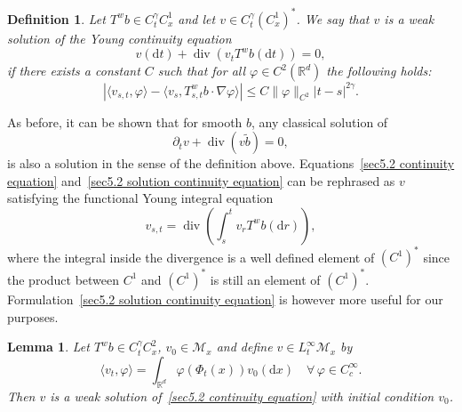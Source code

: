 \documentclass[10pt]{article}
\newcommand{\mathd}{\mathrm{d}}
\newcommand{\tmop}[1]{\ensuremath{\operatorname{#1}}}
\newtheorem{definition}{Definition}
\newtheorem{lemma}{Lemma}
\begin{document}
\begin{definition}
  \label{sec5.2 defn weak continuity eq}Let $T^w b \in C^{\gamma}_t C_x^1$ and
  let $v \in C^{\gamma}_t (C^1_x)^{\ast}$. We say that $v$ is a weak solution
  of the Young continuity equation
  \begin{equation}
    v (\mathd t) + \tmop{div} (v_t T^w b (\mathd t)) = 0, \label{sec5.2
    continuity equation}
  \end{equation}
  if there exists a constant $C$ such that for all $\varphi \in C^2
  (\mathbb{R}^d)$ the following holds:
  \begin{equation}
    | \langle v_{s, t}, \varphi \rangle - \langle v_s, T^w_{s, t} b \cdot
    \nabla \varphi \rangle | \leqslant C \| \varphi \|_{C^2} | t - s |^{2
    \gamma} . \label{sec5.2 solution continuity equation}
  \end{equation}
\end{definition}

\begin{remark}
  As before, it can be shown that for smooth $b$, any classical solution of
  \[ \partial_t v + \tmop{div} (v \tilde{b}) = 0, \]
  is also a solution in the sense of the definition above.
  Equations~{\eqref{sec5.2 continuity equation}} and~{\eqref{sec5.2 solution
  continuity equation}} can be rephrased as $v$ satisfying the functional
  Young integral equation
  \[ v_{s, t} = \tmop{div} \left( \int_s^t v_r T^w b (\mathd r) \right), \]
  where the integral inside the divergence is a well defined element of
  $(C^1)^{\ast}$ since the product between $C^1$ and $(C^1)^{\ast}$ is still
  an element of $(C^1)^{\ast}$. Formulation~{\eqref{sec5.2 solution continuity
  equation}} is however more useful for our purposes.
\end{remark}

\begin{lemma}
  \label{sec5.2 lemma existence continuity}Let $T^w b \in C^{\gamma}_t C^2_x$,
  $v_0 \in \mathcal{M}_x$ and define $v \in L^{\infty}_t \mathcal{M}_x$ by
  \[ \langle v_t, \varphi \rangle = \int_{\mathbb{R}^d} \varphi (\Phi_t (x))
     v_0 (\mathd x) \quad \forall \, \varphi \in C^{\infty}_c . \]
  Then $v$ is a weak solution of~{\eqref{sec5.2 continuity equation}} with
  initial condition $v_0$.
\end{lemma}
\end{document}
